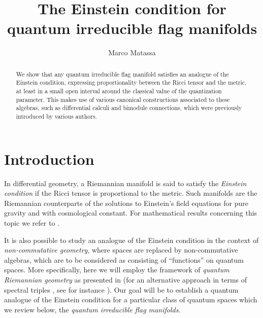 \documentclass[a4paper,12pt,reqno,english]{amsart}
\numberwithin{equation}{section}
\numberwithin{figure}{section}
\theoremstyle{plain}
\theoremstyle{plain}
\theoremstyle{plain}
\theoremstyle{plain}
\theoremstyle{plain}
\theoremstyle{definition}
\theoremstyle{definition}
\theoremstyle{definition}
\theoremstyle{remark}
\theoremstyle{definition}
\begin{document}
\title[The Einstein condition for quantum irreducible flag manifolds]{The Einstein condition for \\ quantum irreducible flag manifolds}

\author{Marco Matassa}

\address{Department of Computer Science, OsloMet – Oslo Metropolitan University, Oslo, Norway}


\begin{abstract}
We show that any quantum irreducible flag manifold satisfies an analogue of the Einstein condition, expressing proportionality between the Ricci tensor and the metric, at least in a small open interval around the classical value of the quantization parameter.
This makes use of various canonical constructions associated to these algebras, such as differential calculi and bimodule connections, which were previously introduced by various authors.
\end{abstract}

\maketitle

\section{Introduction}
\label{sec:introduction}

In differential geometry, a Riemannian manifold is said to satisfy the \emph{Einstein condition} if the Ricci tensor is proportional to the metric.
Such manifolds are the Riemannian counterparts of the solutions to Einstein's field equations for pure gravity and with cosmological constant.
For mathematical results concerning this topic we refer to \cite{besse}.

It is also possible to study an analogue of the Einstein condition in the context of \emph{non-commutative geometry}, where spaces are replaced by non-commutative algebras, which are to be considered as consisting of ``functions'' on quantum spaces.
More specifically, here we will employ the framework of \emph{quantum Riemannian geometry} as presented in \cite{quantum-book} (for an alternative approach in terms of spectral triples \cite{connes}, see for instance \cite{mesland-rennie}).
Our goal will be to establish a quantum analogue of the Einstein condition for a particular class of quantum spaces which we review below, the \emph{quantum irreducible flag manifolds}.
\end{document}
